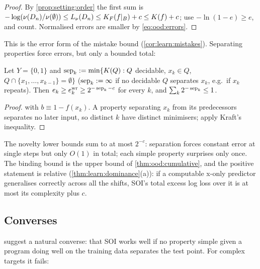 \begin{proof}
By \cref{prop:setting:order} the first sum is $-\log(\nu(D_n)/\nu(\emptyset))\le L_\nu(D_n)\le K_{F}(f|_B)+c\le K(f)+c$; use $-\ln(1-e)\ge e$, and count. Normalised errors are smaller by \eqref{eq:ood:errors}.
\end{proof}

This is the error form of the mistake bound (\cref{cor:learn:mistakes}). Separating properties force errors, but only a bounded total:

\begin{proposition}\label{prop:ood:budget}
Let $Y=\{0,1\}$ and $\operatorname{sep}_k:=\min\{K(Q):Q$ decidable, $x_k\in Q$, $Q\cap\{x_1,\dots,x_{k-1}\}=\emptyset\}$ ($\operatorname{sep}_k:=\infty$ if no decidable $Q$ separates $x_k$, e.g.\ if $x_k$ repeats). Then $e_k\ge e^{\rm wr}_k\ge2^{-\operatorname{sep}_k-c}$ for every $k$, and $\sum_k2^{-\operatorname{sep}_k}\le1$.
\end{proposition}

\begin{proof}
 with $b\equiv1-f(x_k)$. A property separating $x_k$ from its predecessors separates no later input, so distinct $k$ have distinct minimisers; apply Kraft's inequality.
\end{proof}

\begin{remark}\label{rem:ood:lopsided}
The novelty lower bounds sum to at most $2^{-c}$: separation forces constant error at single steps but only $O(1)$ in total; each simple property surprises only once. The binding bound is the upper bound of \cref{thm:ood:cumulative}, and the positive statement is relative (\cref{thm:learn:dominance}(a)): if a computable x-only predictor generalises correctly across all the shifts, SOI's total excess log loss over it is at most its complexity plus $c$.
\end{remark}

\subsection{Converses}\label{sec:ood:converse}

 suggest a natural converse: that SOI works well if no property simple given a program doing well on the training data separates the test point. For complex targets it fails:

